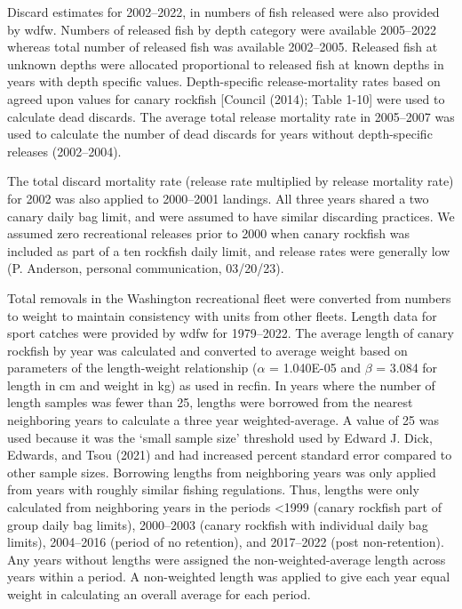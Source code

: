 \documentclass[11pt,
  english,
  letterpaper,
]{article}
\begin{document}
Discard estimates for 2002--2022, in numbers of fish released were also provided by \gls{wdfw}. Numbers of released fish by depth category were available 2005--2022 whereas total number of released fish was available 2002--2005. Released fish at unknown depths were allocated proportional to released fish at known depths in years with depth specific values. Depth-specific release-mortality rates based on agreed upon values for canary rockfish {[}Council (2014); Table 1-10{]} were used to calculate dead discards. The average total release mortality rate in 2005--2007 was used to calculate the number of dead discards for years without depth-specific releases (2002--2004).

The total discard mortality rate (release rate multiplied by release mortality rate) for 2002 was also applied to 2000--2001 landings. All three years shared a two canary daily bag limit, and were assumed to have similar discarding practices. We assumed zero recreational releases prior to 2000 when canary rockfish was included as part of a ten rockfish daily limit, and release rates were generally low (P. Anderson, personal communication, 03/20/23).

Total removals in the Washington recreational fleet were converted from numbers to weight to maintain consistency with units from other fleets. Length data for sport catches were provided by \gls{wdfw} for 1979--2022. The average length of canary rockfish by year was calculated and converted to average weight based on parameters of the length-weight relationship (\(\alpha\) = 1.040E-05 and \(\beta\) = 3.084 for length in cm and weight in kg) as used in \gls{recfin}. In years where the number of length samples was fewer than 25, lengths were borrowed from the nearest neighboring years to calculate a three year weighted-average. A value of 25 was used because it was the `small sample size' threshold used by Edward J. Dick, Edwards, and Tsou (2021) and had increased percent standard error compared to other sample sizes. Borrowing lengths from neighboring years was only applied from years with roughly similar fishing regulations. Thus, lengths were only calculated from neighboring years in the periods \textless1999 (canary rockfish part of group daily bag limits), 2000--2003 (canary rockfish with individual daily bag limits), 2004--2016 (period of no retention), and 2017--2022 (post non-retention). Any years without lengths were assigned the non-weighted-average length across years within a period. A non-weighted length was applied to give each year equal weight in calculating an overall average for each period.
\end{document}
